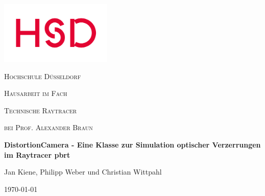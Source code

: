 \newcommand{\docTitel}{DistortionCamera - Eine Klasse zur Simulation optischer Verzerrungen im Raytracer pbrt}
\newcommand{\docUebertitel}{Hausarbeit}
\newcommand{\docAutor}{Jan Kiene, Philipp Weber und Christian Wittpahl}
\newcommand{\docProf}{Prof. Alexander Braun}

\begin{titlepage}
	\centering
	\includegraphics[width=0.40\textwidth]{img/hsd-logo}\par
	\vspace{0.5cm}
	{\scshape\LARGE Hochschule Düsseldorf\par}
	\vspace{1.5cm}
	
	{\scshape\Huge Hausarbeit im Fach\par}
	{\scshape\Huge Technische Raytracer\par}
	
	{\scshape\Large bei \docProf \par}
	
	\vspace{1.5cm}
	{\Huge\bfseries \docTitel \par}
	\vspace{1 cm}	
	{\LARGE \docAutor \par}
	\vfill
	
	{\large \today\par}
\end{titlepage}